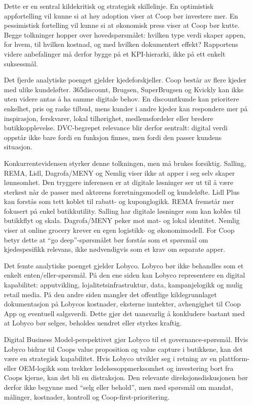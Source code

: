 \documentclass[12pt,a4paper]{article}
\begin{document}
Dette er en sentral kildekritisk og strategisk skillelinje. En optimistisk appfortelling vil kunne si at høy adoption viser at Coop bør investere mer. En pessimistisk fortelling vil kunne si at økonomisk press viser at Coop bør kutte. Begge tolkninger hopper over hovedspørsmålet: hvilken type verdi skaper appen, for hvem, til hvilken kostnad, og med hvilken dokumentert effekt? Rapportens videre anbefalinger må derfor bygge på et KPI-hierarki, ikke på ett enkelt suksessmål.

Det fjerde analytiske poenget gjelder kjedeforskjeller. Coop består av flere kjeder med ulike kundeløfter. 365discount, Brugsen, SuperBrugsen og Kvickly kan ikke uten videre antas å ha samme digitale behov. En discountkunde kan prioritere enkelhet, pris og raske tilbud, mens kunder i andre kjeder kan respondere mer på inspirasjon, ferskvarer, lokal tilhørighet, medlemsfordeler eller bredere butikkopplevelse. DVC-begrepet relevance blir derfor sentralt: digital verdi oppstår ikke bare fordi en funksjon finnes, men fordi den passer kundens situasjon.

Konkurrentevidensen styrker denne tolkningen, men må brukes forsiktig. Salling, REMA, Lidl, Dagrofa/MENY og Nemlig viser ikke at apper i seg selv skaper lønnsomhet. Den tryggere inferensen er at digitale løsninger ser ut til å være sterkest når de passer med aktørens forretningsmodell og kundeløfte. Lidl Plus kan forstås som tett koblet til rabatt- og kuponglogikk. REMA fremstår mer fokusert på enkel butikkutility. Salling har digitale løsninger som kan kobles til butikkflyt og skala. Dagrofa/MENY peker mot mat- og lokal identitet. Nemlig viser at online grocery krever en egen logistikk- og økonomimodell. For Coop betyr dette at ``go deep''-spørsmålet bør forstås som et spørsmål om kjedespesifikk relevans, ikke nødvendigvis som et krav om separate apper.

Det femte analytiske poenget gjelder Lobyco. Lobyco bør ikke behandles som et enkelt enten/eller-spørsmål. På den ene siden kan Lobyco representere en digital kapabilitet: apputvikling, lojalitetsinfrastruktur, data, kampanjelogikk og mulig retail media. På den andre siden mangler det offentlige kildegrunnlaget dokumentasjon på Lobycos kostnader, eksterne inntekter, avhengighet til Coop App og eventuell salgsverdi. Dette gjør det uansvarlig å konkludere bastant med at Lobyco bør selges, beholdes uendret eller styrkes kraftig.

Digital Business Model-perspektivet gjør Lobyco til et governance-spørsmål. Hvis Lobyco bidrar til Coops value proposition og value capture i butikkene, kan det være en strategisk kapabilitet. Hvis Lobyco utvikler seg i retning av en plattform- eller OEM-logikk som trekker ledelsesoppmerksomhet og investering bort fra Coops kjerne, kan det bli en distraksjon. Den relevante direksjonsdiskusjonen bør derfor ikke begynne med ``selg eller behold'', men med spørsmål om mandat, målinger, kostnader, kontroll og Coop-first-prioritering.
\end{document}
